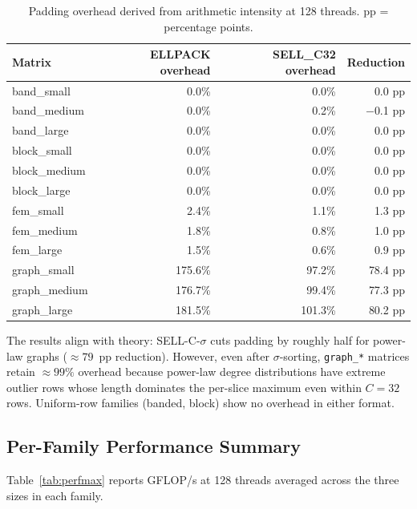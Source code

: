 \documentclass[11pt]{article}
\begin{document}
\begin{table}[h]
\centering
\small
\begin{tabular}{lrrr}
\toprule
Matrix & ELLPACK overhead & SELL\_C32 overhead & Reduction \\
\midrule
band\_small  &  0.0\% &  0.0\% & 0.0 pp \\
band\_medium &  0.0\% &  0.2\% & $-$0.1 pp \\
band\_large  &  0.0\% &  0.0\% & 0.0 pp \\
block\_small &  0.0\% &  0.0\% & 0.0 pp \\
block\_medium&  0.0\% &  0.0\% & 0.0 pp \\
block\_large &  0.0\% &  0.0\% & 0.0 pp \\
fem\_small   &  2.4\% &  1.1\% & 1.3 pp \\
fem\_medium  &  1.8\% &  0.8\% & 1.0 pp \\
fem\_large   &  1.5\% &  0.6\% & 0.9 pp \\
graph\_small & 175.6\% & 97.2\% & 78.4 pp \\
graph\_medium& 176.7\% & 99.4\% & 77.3 pp \\
graph\_large & 181.5\% & 101.3\% & 80.2 pp \\
\bottomrule
\end{tabular}
\caption{Padding overhead derived from arithmetic intensity at 128 threads.
pp = percentage points.}
\label{tab:padding}
\end{table}

The results align with theory: SELL-C-$\sigma$ cuts padding by roughly
half for power-law graphs ($\approx 79$~pp reduction). However, even after
$\sigma$-sorting, \texttt{graph\_*} matrices retain $\approx 99\%$
overhead because power-law degree distributions have extreme outlier rows
whose length dominates the per-slice maximum even within $C=32$ rows.
Uniform-row families (banded, block) show no overhead in either format.

\subsection{Per-Family Performance Summary}

Table~\ref{tab:perfmax} reports GFLOP/s at 128 threads averaged across
the three sizes in each family.
\end{document}
